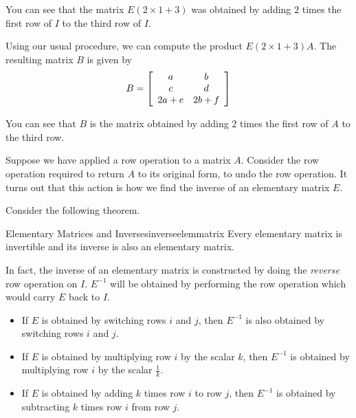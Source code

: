 \begin{solution}
You can see that the matrix $E\left( 2 \times 1+3\right)$ was obtained by adding $2$ times the first row
of $I$ to the third row of $I$. 

Using our usual procedure, we can compute the product $E\left( 2 \times 1+3\right)A$. The resulting 
matrix $B$ is given by 
\begin{equation*}
B = \left[
\begin{array}{cc}
a & b \\
c & d \\
2a+e & 2b+f
\end{array}
\right]
\end{equation*}

You can see that $B$ is the matrix obtained by adding $2$ times the first row of $A$ to the third row. 
\end{solution}

Suppose we have applied a row operation to a matrix $A$. Consider the row operation required to return $A$ to its original form, to undo
the row operation. It turns out that this action is how we find the inverse of an elementary matrix $E$. 

Consider the following theorem.

\begin{theorem}{Elementary Matrices and Inverses}{inverseelemmatrix}
Every elementary matrix is invertible and its inverse is also an elementary matrix. 
\end{theorem}

In fact, the inverse of an elementary matrix is constructed by doing the {\em reverse \em}row operation on $I$. $E^{-1}$ will
be obtained by performing the row operation which would carry $E$ back to $I$. 

\begin{itemize}
\item If $E$ is obtained by switching rows $i$ and $j$, then $E^{-1}$ is also obtained by switching rows $i$ and $j$. 

\item If $E$ is obtained by multiplying row $i$ by the scalar $k$, then $E^{-1}$ is obtained by multiplying row $i$ by
the scalar $\frac{1}{k}$. 

\item If $E$ is obtained by adding $k$ times row $i$ to row $j$, then $E^{-1}$ is obtained by 
subtracting $k$ times row $i$ from row $j$.
\end{itemize} 

